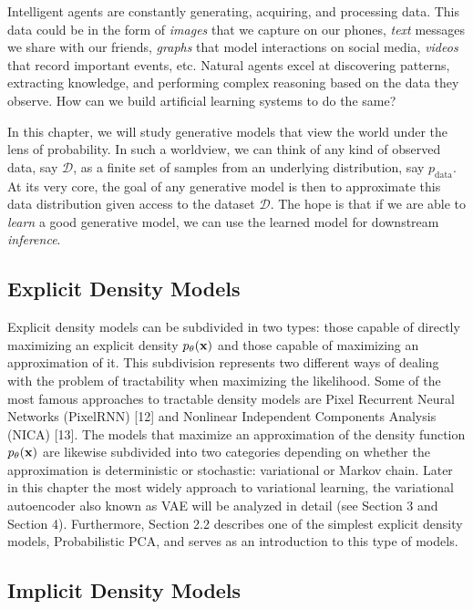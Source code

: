Intelligent agents are constantly generating, acquiring, and processing
data. This data could be in the form of {\em images} that we capture on our
phones, {\em text} messages we share with our friends, {\em graphs} that model
interactions on social media, {\em videos} that record important events,
etc. Natural agents excel at discovering patterns, extracting
knowledge, and performing complex reasoning based on the data they observe. How
can we build artificial learning systems to do the same?

In this chapter, we will study generative models that view the world under the lens of probability.
In such a worldview, we can think of any kind of
observed data, say $\mathcal{D}$, as a finite set of samples from an
underlying distribution, say $p_{\mathrm{data}}$. At its very core, the
goal of any generative model is then to approximate this data
distribution given access to the dataset $\mathcal{D}$. The hope is that
if we are able to {\em learn} a good generative model, we can use the
learned model for downstream {\em inference}.


\subsection{Explicit Density Models}

Explicit density models can be subdivided in two types: those capable of directly 
maximizing an explicit density $p_\theta(\mathbf{x})$ and those capable of maximizing an 
approximation of it. This subdivision represents two different ways of dealing with 
the problem of tractability when maximizing the likelihood. Some of the most famous 
approaches to tractable density models are Pixel Recurrent Neural Networks 
(PixelRNN) [12] and Nonlinear Independent Components Analysis (NICA) [13].
The models that maximize an approximation of the density function $p_\theta(\mathbf{x})$ 
are likewise subdivided into two categories depending on whether the approximation 
is deterministic or stochastic: variational or Markov chain. Later in this chapter 
the most widely approach to variational learning, the variational autoencoder also 
known as VAE will be analyzed in detail (see Section 3 and Section 4).
Furthermore, Section 2.2 describes one of the simplest explicit density models, 
Probabilistic PCA, and serves as an introduction to this type of models.


\subsection{Implicit Density Models}

